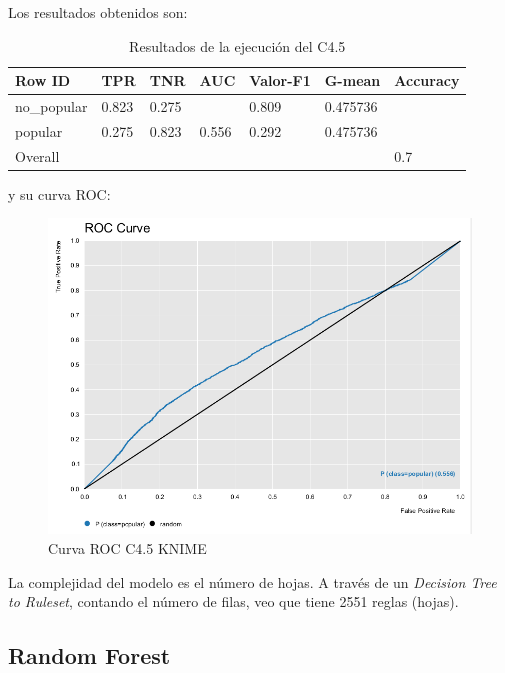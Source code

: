 Los resultados obtenidos son:

\begin{table}[H]
	\centering
	\begin{tabular}{|l|l|l|l|l|l|l|}
		\hline
		Row ID      & TPR   & TNR   & AUC   & Valor-F1 & G-mean   & Accuracy \\ \hline
		no\_popular & 0.823 & 0.275 &       & 0.809    & 0.475736 &          \\ \hline
		popular     & 0.275 & 0.823 & 0.556 & 0.292    & 0.475736 &          \\ \hline
		Overall     &       &       &       &          &          & 0.7      \\ \hline
	\end{tabular}
	\caption{Resultados de la ejecución del C4.5}
	\label{tab:c45}
\end{table}

y su curva ROC:

\begin{figure}[H] %
	\centering
	\includegraphics[scale=0.385]{roc-c45-p.png}  %
	\caption{Curva ROC C4.5 KNIME} 
	\label{fig:rocc45-p}
\end{figure}

La complejidad del modelo es el número de hojas. A través de un \textit{Decision Tree to Ruleset}, contando el número de filas, veo que tiene 2551 reglas (hojas).

\subsection{Random Forest}

